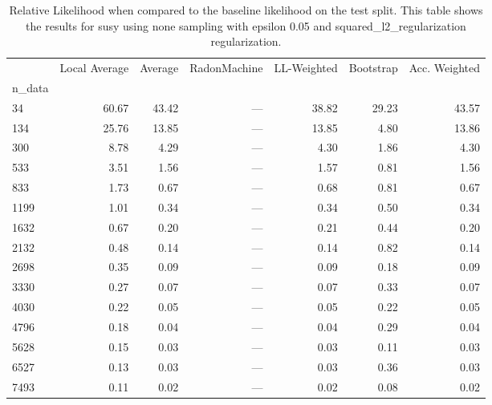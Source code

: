 \begin{table}
\centering
\caption{Relative Likelihood when compared to the baseline likelihood on the test split. This table shows the results for  susy using  none sampling with epsilon  0.05 and  squared_l2_regularization regularization.}
\label{tab:3}
\begin{tabular}{lrrrrrr}
\toprule
{} &  Local Average &  Average &  RadonMachine &  LL-Weighted &  Bootstrap &  Acc. Weighted \\
n\_data &                &          &               &              &            &                \\
\midrule
34     &          60.67 &    43.42 &           --- &        38.82 &      29.23 &          43.57 \\
134    &          25.76 &    13.85 &           --- &        13.85 &       4.80 &          13.86 \\
300    &           8.78 &     4.29 &           --- &         4.30 &       1.86 &           4.30 \\
533    &           3.51 &     1.56 &           --- &         1.57 &       0.81 &           1.56 \\
833    &           1.73 &     0.67 &           --- &         0.68 &       0.81 &           0.67 \\
1199   &           1.01 &     0.34 &           --- &         0.34 &       0.50 &           0.34 \\
1632   &           0.67 &     0.20 &           --- &         0.21 &       0.44 &           0.20 \\
2132   &           0.48 &     0.14 &           --- &         0.14 &       0.82 &           0.14 \\
2698   &           0.35 &     0.09 &           --- &         0.09 &       0.18 &           0.09 \\
3330   &           0.27 &     0.07 &           --- &         0.07 &       0.33 &           0.07 \\
4030   &           0.22 &     0.05 &           --- &         0.05 &       0.22 &           0.05 \\
4796   &           0.18 &     0.04 &           --- &         0.04 &       0.29 &           0.04 \\
5628   &           0.15 &     0.03 &           --- &         0.03 &       0.11 &           0.03 \\
6527   &           0.13 &     0.03 &           --- &         0.03 &       0.36 &           0.03 \\
7493   &           0.11 &     0.02 &           --- &         0.02 &       0.08 &           0.02 \\
\bottomrule
\end{tabular}
\end{table}
